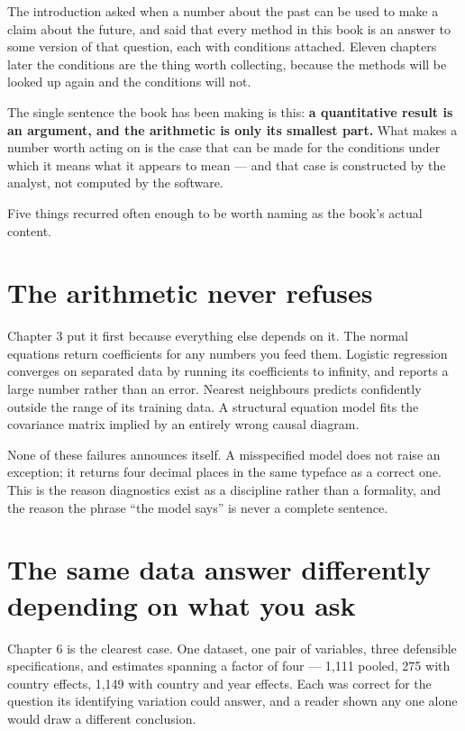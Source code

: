 \documentclass[
  letterpaper,
  10pt,
  twoside,
  openright,
  numbers=noenddot,
  chapterprefix=true]{scrbook}
\begin{document}
The introduction asked when a number about the past can be used to make
a claim about the future, and said that every method in this book is an
answer to some version of that question, each with conditions attached.
Eleven chapters later the conditions are the thing worth collecting,
because the methods will be looked up again and the conditions will not.

The single sentence the book has been making is this: \textbf{a
quantitative result is an argument, and the arithmetic is only its
smallest part.} What makes a number worth acting on is the case that can
be made for the conditions under which it means what it appears to mean
--- and that case is constructed by the analyst, not computed by the
software.

Five things recurred often enough to be worth naming as the book's
actual content.

\section{The arithmetic never
refuses}\label{the-arithmetic-never-refuses}

Chapter 3 put it first because everything else depends on it. The normal
equations return coefficients for any numbers you feed them. Logistic
regression converges on separated data by running its coefficients to
infinity, and reports a large number rather than an error. Nearest
neighbours predicts confidently outside the range of its training data.
A structural equation model fits the covariance matrix implied by an
entirely wrong causal diagram.

None of these failures announces itself. A misspecified model does not
raise an exception; it returns four decimal places in the same typeface
as a correct one. This is the reason diagnostics exist as a discipline
rather than a formality, and the reason the phrase ``the model says'' is
never a complete sentence.

\section{The same data answer differently depending on what you
ask}\label{the-same-data-answer-differently-depending-on-what-you-ask}

Chapter 6 is the clearest case. One dataset, one pair of variables,
three defensible specifications, and estimates spanning a factor of four
--- 1,111 pooled, 275 with country effects, 1,149 with country and year
effects. Each was correct for the question its identifying variation
could answer, and a reader shown any one alone would draw a different
conclusion.
\end{document}
